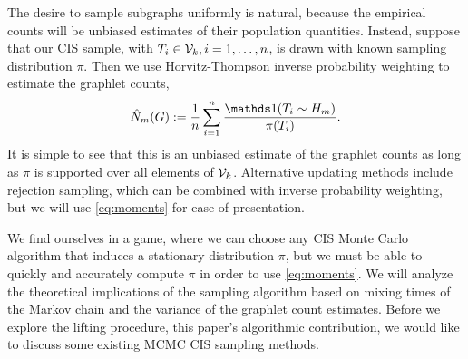 The desire to sample subgraphs uniformly is natural, because the empirical counts will be unbiased estimates of their population quantities.
Instead, suppose that our CIS sample, with $T_i \in \mathcal{V}_k, i=1,\ldots,n$, is drawn with known sampling distribution $\pi$.
Then we use Horvitz-Thompson inverse probability weighting to estimate the graphlet counts,
\begin{equation}
  \label{eq:moments}
  \hat N_m(G) := \frac{1}{n} \sum_{i=1}^n \frac{\ind(T_i\sim H_m)}{\pi(T_i)}.  
\end{equation}
It is simple to see that this is an unbiased estimate of the graphlet counts as long as $\pi$ is supported over all elements of $\mathcal{V}_k$.
Alternative updating methods include rejection sampling, which can be combined with inverse probability weighting, but we will use \eqref{eq:moments} for ease of presentation.

We find ourselves in a game, where we can choose any CIS Monte Carlo algorithm that induces a stationary distribution $\pi$, but we must be able to quickly and accurately compute $\pi$ in order to use \eqref{eq:moments}.
We will analyze the theoretical implications of the sampling algorithm based on mixing times of the Markov chain and the variance of the graphlet count estimates.
Before we explore the lifting procedure, this paper's algorithmic contribution, we would like to discuss some existing MCMC CIS sampling methods.





